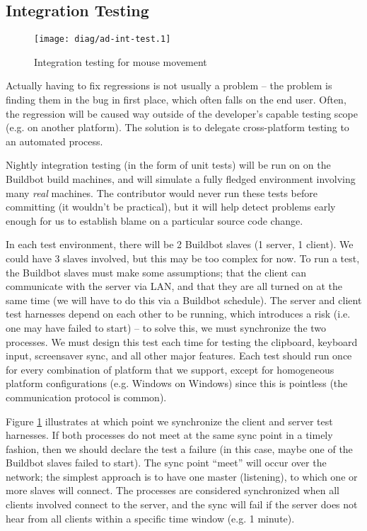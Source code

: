 \subsection{Integration Testing}

\begin{figure}[ht!]
  \centering
  \texttt{[image: diag/ad-int-test.1]}
  \caption{Integration testing for mouse movement}
  \label{fig:integrationTesting}
\end{figure}

Actually having to fix regressions is not usually a problem -- the problem is
finding them in the bug in first place, which often falls on the end user. 
Often, the regression will be caused way outside of the developer's capable 
testing scope (e.g. on another platform). The solution is to delegate 
cross-platform testing to an automated process.

Nightly integration testing (in the form of unit tests) will be run on on the 
Buildbot build machines, and will simulate a fully fledged environment involving
many \textit{real} machines. The contributor would never run these tests before
committing (it wouldn't be  practical), but it will help detect problems early
enough for us to establish blame on a particular source code change.

In each test environment, there will be 2 Buildbot slaves (1 server, 1 client).
We could have 3 slaves involved, but this may be too complex for now.
To run a test, the Buildbot slaves must make some assumptions; that the client
can communicate with the server via LAN, and that they are all turned on at the 
same time (we will have to do this via a Buildbot schedule). The server and 
client test harnesses depend on each other to be running, which introduces a
risk (i.e. one may have failed to start) -- to solve this, we must synchronize
the two processes. We must design this test each time for testing the clipboard,
keyboard input, screensaver sync, and all other major features. Each test should
run once for every combination of platform that we support, except for 
homogeneous platform configurations (e.g. Windows on Windows) since this is
pointless (the communication protocol is common).

Figure \ref{fig:integrationTesting} illustrates at which point we synchronize
the client and server test harnesses. If both processes do not meet at the same
sync point in a timely fashion, then we should declare the test a failure (in
this case, maybe one of the Buildbot slaves failed to start). The sync point
``meet'' will occur over the network; the simplest approach is to have one 
master (listening), to which one or more slaves will connect. The processes are
considered synchronized when all clients involved connect to the server, and
the sync will fail if the server does not hear from all clients within a 
specific time window (e.g. 1 minute).

